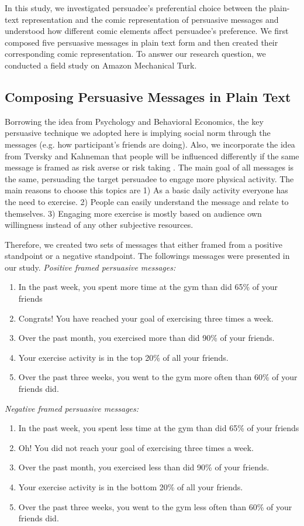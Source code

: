 In this study, we investigated persuadee's preferential choice between the plain-text representation and the comic representation of persuasive messages and understood how different comic elements affect persuadee's preference. We first composed five persuasive messages in plain text form and then created their corresponding comic representation. To answer our research question, we conducted a field study on Amazon Mechanical Turk.

\subsection{Composing Persuasive Messages in Plain Text}
Borrowing the idea from Psychology and Behavioral Economics, the key persuasive technique we adopted here is implying social norm through the messages (e.g. how participant's friends are doing). Also, we incorporate the idea from Tversky and Kahneman that people will be influenced differently if the same message is framed as risk averse or risk taking \cite{tversky1981framing}. The main goal of all messages is the same, persuading the target persuadee to engage more physical activity. The main reasons to choose this topics are 1) As a basic daily activity everyone has the need to exercise. 2) People can easily understand the message and relate to themselves. 3) Engaging more exercise is mostly based on audience own willingness instead of any other subjective resources.\par

Therefore, we created two sets of messages that either framed from a positive standpoint or a negative standpoint. The followings messages were presented in our study.
\textit{Positive framed persuasive messages:}
\begin{enumerate}
 \item In the past week, you spent more time at the gym than did 65\% of your friends
 \item Congrats! You have reached your goal of exercising three times a week.
 \item Over the past month, you exercised more than did 90\% of your friends.
 \item Your exercise activity is in the top 20\% of all your friends.
 \item Over the past three weeks, you went to the gym more often than 60\% of your friends did.
\end{enumerate}\par
\textit{Negative framed persuasive messages:}
\begin{enumerate}
 \item	In the past week, you spent less time at the gym than did 65\% of your friends
 \item  Oh! You did not reach your goal of exercising three times a week.
 \item	Over the past month, you exercised less than did 90\% of your friends.
 \item	Your exercise activity is in the bottom 20\% of all your friends.
 \item	Over the past three weeks, you went to the gym less often than 60\% of your friends did.
\end{enumerate}

